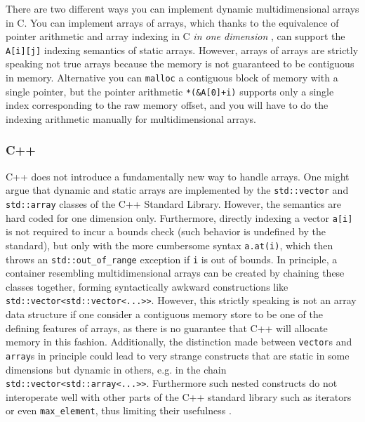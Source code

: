 \documentclass[preprint]{sigplanconf}
\newcommand{\code}[1]{\texttt{#1}}
\begin{document}
There are two different ways you can implement dynamic multidimensional arrays
in C. You can implement arrays of arrays, which thanks to the equivalence of
pointer arithmetic and array indexing in C \textit{in one dimension}
\cite[pp.~93--96]{Kernigham:1978cp}, can support the \code{A[i][j]} indexing
semantics of static arrays. However, arrays of arrays are strictly speaking
not true arrays because the memory is not guaranteed to be contiguous in
memory. Alternative you can \code{malloc} a contiguous block of memory with a
single pointer, but the pointer arithmetic \code{*(\&A[0]+i)} supports only a
single index corresponding to the raw memory offset, and you will have to do
the indexing arithmetic manually for multidimensional arrays.


\subsubsection{C++}


C++ does not introduce a fundamentally new way to handle arrays. One might
argue that dynamic and static arrays are implemented by the \code{std::vector}
and \code{std::array} classes of the C++ Standard Library. However, the
semantics are hard coded for one dimension only. Furthermore, directly
indexing a vector \code{a[i]} is not required to incur a bounds check (such
behavior is undefined by the standard), but only with the more cumbersome
syntax \code{a.at(i)}, which then throws an \code{std::out\_of\_range}
exception if \code{i} is out of bounds. In principle, a container resembling
multidimensional arrays can be created by chaining these classes together,
forming syntactically awkward constructions like
\code{std::vector<std::vector<...>>}. However, this strictly speaking is not
an array data structure if one consider a contiguous memory store to be one of
the defining features of arrays, as there is no guarantee that C++ will
allocate memory in this fashion. Additionally, the distinction made between
\code{vector}s and \code{array}s in principle could lead to very strange
constructs that are static in some dimensions but dynamic in others, e.g. in
the chain \code{std::vector<std::array<...>>}. Furthermore such nested constructs
do not interoperate well with other parts of the C++ standard library such as
iterators or even \code{max\_element}, thus limiting their usefulness
\cite{Bavestrelli:2000ct}.
\end{document}
